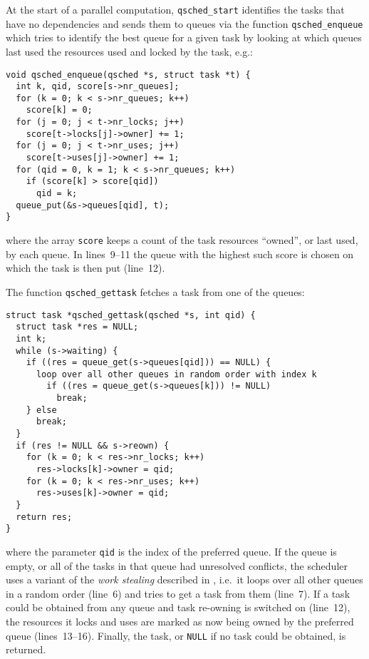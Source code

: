 \documentclass[preprint]{elsarticle}
\begin{document}
At the start of a parallel computation, {\tt qsched\_start}
identifies the tasks that have no dependencies and sends them
to queues via the function {\tt qsched\_enqueue} which
tries to identify the best
queue for a given task by looking at which queues last used
the resources used and locked by the task, e.g.:
\begin{center}\begin{minipage}{0.9\textwidth}
    \begin{lstlisting}
void qsched_enqueue(qsched *s, struct task *t) {
  int k, qid, score[s->nr_queues];
  for (k = 0; k < s->nr_queues; k++)
    score[k] = 0;
  for (j = 0; j < t->nr_locks; j++)
    score[t->locks[j]->owner] += 1;
  for (j = 0; j < t->nr_uses; j++)
    score[t->uses[j]->owner] += 1;
  for (qid = 0, k = 1; k < s->nr_queues; k++)
    if (score[k] > score[qid])
      qid = k;
  queue_put(&s->queues[qid], t);
}
    \end{lstlisting}
\end{minipage}\end{center}
\noindent where the array {\tt score} keeps a count of the
task resources ``owned'', or last used, by each queue.
In lines~9--11 the queue with the highest such score is 
chosen on which the task is then put (line~12).

The function {\tt qsched\_gettask} fetches a task from
one of the queues:
\begin{center}\begin{minipage}{0.9\textwidth}
    \begin{lstlisting}
struct task *qsched_gettask(qsched *s, int qid) {
  struct task *res = NULL;
  int k;
  while (s->waiting) {
    if ((res = queue_get(s->queues[qid])) == NULL) {
      loop over all other queues in random order with index k
        if ((res = queue_get(s->queues[k])) != NULL)
          break;
    } else
      break;
  }
  if (res != NULL && s->reown) {
    for (k = 0; k < res->nr_locks; k++)
      res->locks[k]->owner = qid;
    for (k = 0; k < res->nr_uses; k++)
      res->uses[k]->owner = qid;
  }
  return res;
}
    \end{lstlisting}
\end{minipage}\end{center}
\noindent where the parameter {\tt qid} is the index of the
preferred queue.
If the queue is empty, or all of the tasks in that queue had
unresolved conflicts, the scheduler uses a variant of the
{\em work stealing} described in \cite{ref:Blumofe1999},
i.e.~it loops over all other queues
in a random order (line~6) and tries to get a task from them
(line~7).
If a task could be obtained from any queue and task re-owning
is switched on (line~12),
the resources it locks and uses are marked as now being owned
by the preferred queue (lines~13--16).
Finally, the task, or {\tt NULL} if no task could be obtained,
is returned.
\end{document}
